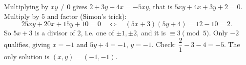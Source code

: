Multiplying by $xy\ne0$ gives $2+3y+4x=-5xy$, that is $5xy+4x+3y+2=0$. Multiply by $5$ and factor (Simon's trick):
\[
25xy+20x+15y+10=0\quad\Longleftrightarrow\quad(5x+3)(5y+4)=12-10=2 .
\]
So $5x+3$ is a divisor of $2$, i.e. one of $\pm1,\pm2$, and it is $\equiv3\pmod5$. Only $-2$ qualifies, giving $x=-1$ and $5y+4=-1$, $y=-1$. Check: $\dfrac{2}{1}-3-4=-5$. The only solution is $\boxed{(x,y)=(-1,-1)}$.
